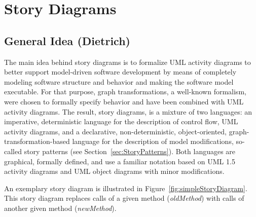 \section{Story Diagrams} \label{sec:StoryDiagrams}

\subsection{General Idea (Dietrich)}


The main idea behind story diagrams is to formalize UML activity diagrams
to better support model-driven software development
by means of completely modeling software structure and behavior and making the software model executable.
For that purpose, graph transformations, a well-known formalism, were chosen to formally specify behavior and have been combined with UML activity diagrams.
The result, story diagrams, is a mixture of two languages:
an imperative, deterministic language for the description of control flow, UML activity diagrams,
and a declarative, non-deterministic, object-oriented, graph-transformation-based language for the description of model modifications, so-called story patterns (see Section~\ref{sec:StoryPatterns}).
Both languages are graphical, formally defined, and use a familiar notation based on UML 1.5 activity diagrams and UML object diagrams with minor modifications.

An exemplary story diagram is illustrated in Figure~\ref{fig:simpleStoryDiagram}.
This story diagram replaces calls of a given method (\emph{oldMethod}) with calls of another given method (\emph{newMethod}).

